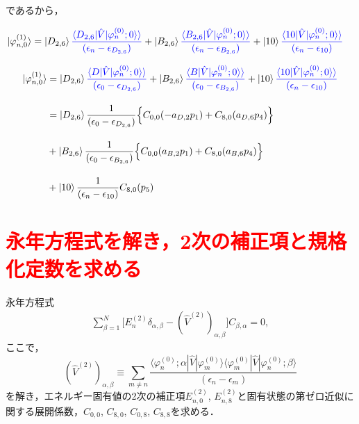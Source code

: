 であるから，


\begin{align}
    \ket{\varphi_{n,0}^{(1)}}
    &=
    \ket{D_{2,6}}
    \textcolor{blue}{
    \frac{\braket{D_{2,6}|\hat{V}|\varphi^{(0)}_n;0}\rangle}{(\epsilon_n-\epsilon_{D_{2,6}})}}
    +
    \ket{B_{2,6}}
    \textcolor{blue}{
    \frac{\braket{B_{2,6}|\hat{V}|\varphi^{(0)}_n;0}\rangle}{(\epsilon_n-\epsilon_{B_{2,6}})}}
    +
    \ket{10}
    \textcolor{blue}{
    \frac{\braket{10|\hat{V}|\varphi^{(0)}_n;0}\rangle}{(\epsilon_n-\epsilon_{10})}}
\end{align}

\begin{align}
    \ket{\varphi_{n,0}^{(1)}}
    &=
    \ket{D_{2,6}}
    \textcolor{blue}{
    \frac{\braket{D|\hat{V}|\varphi^{(0)}_n;0}\rangle}{(\epsilon_{0}-\epsilon_{D_{2,6}})}}
    +
    \ket{B_{2,6}}
    \textcolor{blue}{
    \frac{\braket{B|\hat{V}|\varphi^{(0)}_n;0}\rangle}{(\epsilon_0-\epsilon_{B_{2,6}})}}
    +
    \ket{10}
    \textcolor{blue}{
    \frac{\braket{10|\hat{V}|\varphi^{(0)}_n;0}\rangle}{(\epsilon_n-\epsilon_{10})}}
    \\[10pt]
    &=\ket{D_{2,6}}
    \frac{1}{(\epsilon_{0}-\epsilon_{D_{2,6}})}
    \Bigl\{C_{0,0}(-a_{D,2} p_1) + C_{8,0} (a_{D,6} p_4)\Bigr\}\nn[10pt]
    &+
    \ket{B_{2,6}}
    \frac{1}{(\epsilon_{0}-\epsilon_{B_{2,6}})}
    \Bigl\{C_{0,0}(a_{B,2} p_1) + C_{8,0} (a_{B,6} p_4)\Bigr\}\nn[10pt]
    &+
    \ket{10}
    \frac{1}{(\epsilon_n-\epsilon_{10})}
    C_{8,0} (p_5)
\end{align}






\section*{\textcolor{red}{永年方程式を解き，2次の補正項と規格化定数を求める}}
永年方程式
\begin{align}\label{2ndpertubation_matrix}
\sum_{\beta=1}^{N}\Biggl[
E^{(2)}_n \delta_{\alpha,\beta}
-(\hat{V}^{(2)})_{\alpha,\beta}
\biggr]C_{\beta,\alpha}=0,
\end{align}
ここで，
\begin{equation}
    (\hat{V}^{(2)})_{\alpha,\beta}
    \equiv\sum_{m\neq n}
    \frac{\langle{\varphi^{(0)}_n;\alpha|\hat{V}|\varphi^{(0)}_m}\rangle
    \langle{\varphi^{(0)}_{m}|\hat{V}|\varphi^{(0)}_n;\beta}\rangle}
    {(\epsilon_n-\epsilon_m)}
\end{equation}
を解き，エネルギー固有値の2次の補正項$E_{n,0}^{(2)}$, $E_{n,8}^{(2)}$と固有状態の第ゼロ近似に関する展開係数，$C_{0,0}$, $C_{8,0}$, $C_{0,8}$, $C_{8,8}$を求める．





